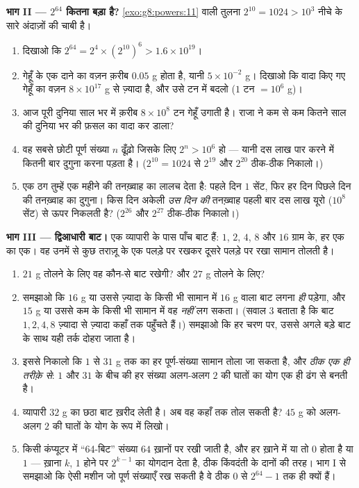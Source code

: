 \begin{problem}[{सप्ताहांत समस्या --- गुणोत्तर योग
$1 + 2 + 4 + \dots + 2^{n-1} = 2^n - 1$, एक मशहूर किंवदंती से
द्विआधारी संख्याओं तक}]
\medskip
\noindent\textbf{भाग II --- $2^{64}$ कितना बड़ा है?}
\cref{exo:g8:powers:11} वाली तुलना $2^{10} = 1024 > 10^3$ नीचे के
सारे अंदाज़ों की चाबी है।
\begin{enumerate}[resume]
  \item दिखाओ कि
        $2^{64} = 2^4 \times \left(2^{10}\right)^6 > 1.6 \times
        10^{19}$।
  \item गेहूँ के एक दाने का वज़न क़रीब $0.05$ g होता है, यानी
        $5 \times 10^{-2}$ g। दिखाओ कि वादा किए गए गेहूँ का वज़न
        $8 \times 10^{17}$ g से ज़्यादा है, और उसे टन में बदलो
        ($1$ टन $= 10^6$ g)।
  \item आज पूरी दुनिया साल भर में क़रीब $8 \times 10^8$ टन गेहूँ
        उगाती है। राजा ने कम से कम कितने साल की दुनिया भर की फ़सल
        का वादा कर डाला?
  \item वह सबसे छोटी पूर्ण संख्या $n$ ढूँढ़ो जिसके लिए
        $2^n > 10^6$ हो --- यानी दस लाख पार करने में कितनी बार
        दुगुना करना पड़ता है। ($2^{10} = 1024$ से $2^{19}$ और
        $2^{20}$ ठीक-ठीक निकालो।)
  \item एक ठग तुम्हें एक महीने की तनख़्वाह का लालच देता है: पहले दिन
        $1$ सेंट, फिर हर दिन पिछले दिन की तनख़्वाह का दुगुना। किस
        दिन अकेली \emph{उस दिन की} तनख़्वाह पहली बार दस लाख यूरो
        ($10^8$ सेंट) से ऊपर निकलती है? ($2^{26}$ और $2^{27}$
        ठीक-ठीक निकालो।)
\end{enumerate}

\medskip
\noindent\textbf{भाग III --- द्विआधारी बाट।}
एक व्यापारी के पास पाँच बाट हैं: $1$, $2$, $4$, $8$ और $16$ ग्राम
के, हर एक का एक। वह उनमें से कुछ तराज़ू के एक पलड़े पर रखकर दूसरे
पलड़े पर रखा सामान तोलती है।
\begin{enumerate}[resume]
  \item $21$ g तोलने के लिए वह कौन-से बाट रखेगी? और $27$ g तोलने
        के लिए?
  \item समझाओ कि $16$ g या उससे ज़्यादा के किसी भी सामान में $16$ g
        वाला बाट लगना \emph{ही} पड़ेगा, और $15$ g या उससे कम के
        किसी भी सामान में वह \emph{नहीं} लग सकता। (सवाल 3 बताता है
        कि बाट $1, 2, 4, 8$ ज़्यादा से ज़्यादा कहाँ तक पहुँचते
        हैं।) समझाओ कि हर चरण पर, उससे अगले बड़े बाट के साथ यही तर्क
        दोहरा जाता है।
  \item इससे निकालो कि $1$ से $31$ g तक का हर पूर्ण-संख्या सामान
        तोला जा सकता है, और \emph{ठीक एक ही तरीक़े से}: $1$ और $31$
        के बीच की हर संख्या अलग-अलग $2$ की घातों का योग एक ही ढंग
        से बनती है।
  \item व्यापारी $32$ g का छठा बाट ख़रीद लेती है। अब वह कहाँ तक तोल
        सकती है? $45$ g को अलग-अलग $2$ की घातों के योग के रूप में
        लिखो।
  \item किसी कंप्यूटर में ``64-बिट'' संख्या $64$ ख़ानों पर रखी जाती
        है, और हर ख़ाने में या तो $0$ होता है या $1$ --- ख़ाना $k$,
        $1$ होने पर $2^{k-1}$ का योगदान देता है, ठीक किंवदंती के
        दानों की तरह। भाग I से समझाओ कि ऐसी मशीन जो पूर्ण संख्याएँ
        रख सकती है वे ठीक $0$ से $2^{64} - 1$ तक ही क्यों हैं।
\end{enumerate}
\end{problem}
